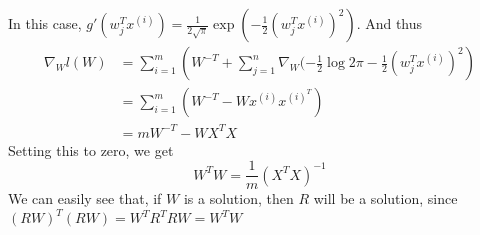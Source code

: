 \begin{answer}
    In this case, $g'(w^T_j x^{(i)}) = \frac{1}{2\sqrt \pi} \exp (-\frac{1}{2}(w^T_jx^{(i)})^2)$. And thus
$$
\begin{aligned}
\nabla_Wl(W) &= \sum_{i=1}^m \left(W^{-T} + \sum_{j=1}^n\nabla_W(-\frac{1}{2}\log 2\pi - \frac{1}{2}(w_j^Tx^{(i)})^2\right)\\
&= \sum_{i=1}^m \left(W^{-T}  - Wx^{(i)}x^{(i)^T}\right)\\
&= mW^{-T} - WX^TX
\end{aligned}
$$
Setting this to zero, we get
$$
W^TW = \frac{1}{m}(X^TX)^{-1}
$$
We can easily see that, if $W$ is a solution, then $R$ will be a solution, since $(RW)^T(RW) = W^TR^TRW = W^TW$
\end{answer}
